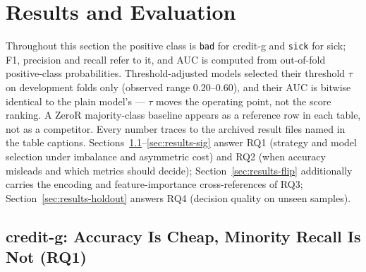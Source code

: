 
\section{Results and Evaluation}
\label{sec:results}

Throughout this section the positive class is \texttt{bad} for credit-g and \texttt{sick} for sick; F1, precision and recall refer to it, and AUC is computed from out-of-fold positive-class probabilities. Threshold-adjusted models selected their threshold $\tau$ on development folds only (observed range 0.20--0.60), and their AUC is bitwise identical to the plain model's --- $\tau$ moves the operating point, not the score ranking. A ZeroR majority-class baseline appears as a reference row in each table, not as a competitor. Every number traces to the archived result files named in the table captions. Sections~\ref{sec:results-creditg}--\ref{sec:results-sig} answer RQ1 (strategy and model selection under imbalance and asymmetric cost) and RQ2 (when accuracy misleads and which metrics should decide); Section~\ref{sec:results-flip} additionally carries the encoding and feature-importance cross-references of RQ3; Section~\ref{sec:results-holdout} answers RQ4 (decision quality on unseen samples).

\subsection{credit-g: Accuracy Is Cheap, Minority Recall Is Not (RQ1)}
\label{sec:results-creditg}

